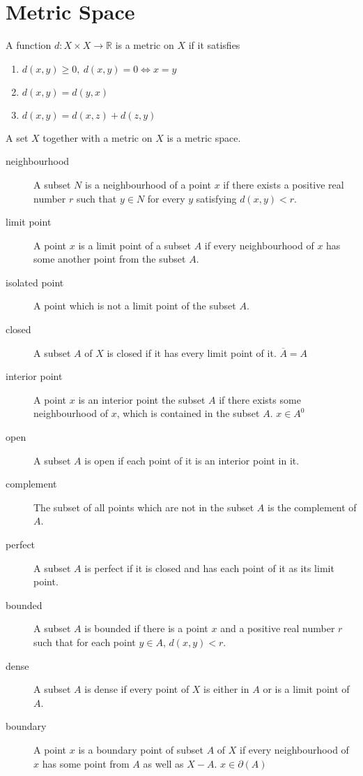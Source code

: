 
\section{Metric Space}
	\begin{definition}
		A function $d : X \times X \to \mathbb{R}$ is a metric on $X$ if it satisfies
		\begin{enumerate}
			\item $d(x,y) \ge 0,\ d(x,y) = 0 \iff x = y$
			\item $d(x,y) = d(y,x)$
			\item $d(x,y) = d(x,z) + d(z,y)$
		\end{enumerate}
	\end{definition}
	\begin{definition}
		A set $X$ together with a metric on $X$ is a metric space.
	\end{definition}
	\begin{description}
		\item[neighbourhood] A subset $N$ is a neighbourhood of a point $x$ if there exists a positive real number $r$ such that $y \in N$ for every $y$ satisfying $d(x,y) < r$.
		\item[limit point] A point $x$ is a limit point of a subset $A$ if every neighbourhood of $x$ has some another point from the subset $A$.
		\item[isolated point] A point which is not a limit point of the subset $A$.
		\item[closed] A subset $A$ of $X$ is closed if it has every limit point of it. $\overline{A} = A$
		\item[interior point] A point $x$ is an interior point the subset $A$ if there exists some neighbourhood of $x$, which is contained in the subset $A$. $x \in A^0$
		\item[open] A subset $A$ is open if each point of it is an interior point in it.
		\item[complement] The subset of all points which are not in the subset $A$ is the complement of $A$.
		\item[perfect] A subset $A$ is perfect if it is closed and has each point of it as its limit point.
		\item[bounded] A subset $A$ is bounded if there is a point $x$ and a positive real number $r$ such that for each point $y \in A$, $d(x,y) < r$.
		\item[dense] A subset $A$ is dense if every point of $X$ is either in $A$ or is a limit point of $A$.
		\item[boundary] A point $x$ is a boundary point of subset $A$ of $X$ if every neighbourhood of $x$ has some point from $A$ as well as $X-A$. $x \in \partial(A)$
	\end{description}
